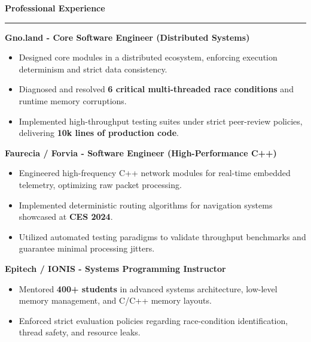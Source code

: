 \documentclass[9pt]{extarticle}
\begin{document}
\par\vspace{5pt}

{\large\bfseries Professional Experience}
\par\vspace{-8pt}
\rule{\linewidth}{0.4pt}
\par\vspace{5pt}

{\bfseries Gno.land - Core Software Engineer (Distributed Systems)}
\begin{itemize}[noitemsep, topsep=0pt]
    \item Designed core modules in a distributed ecosystem, enforcing execution determinism and strict data consistency.
    \item Diagnosed and resolved {\bfseries 6 critical multi-threaded race conditions} and runtime memory corruptions.
    \item Implemented high-throughput testing suites under strict peer-review policies, delivering {\bfseries 10k lines of production code}.
\end{itemize}

\par\vspace{5pt}

{\bfseries Faurecia / Forvia - Software Engineer (High-Performance C++)}
\begin{itemize}[noitemsep, topsep=0pt]
    \item Engineered high-frequency C++ network modules for real-time embedded telemetry, optimizing raw packet processing.
    \item Implemented deterministic routing algorithms for navigation systems showcased at {\bfseries CES 2024}.
    \item Utilized automated testing paradigms to validate throughput benchmarks and guarantee minimal processing jitters.
\end{itemize}

\par\vspace{5pt}

{\bfseries Epitech / IONIS - Systems Programming Instructor}
\begin{itemize}[noitemsep, topsep=0pt]
    \item Mentored {\bfseries 400+ students} in advanced systems architecture, low-level memory management, and C/C++ memory layouts.
    \item Enforced strict evaluation policies regarding race-condition identification, thread safety, and resource leaks.
\end{itemize}
\end{document}
